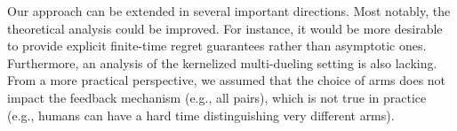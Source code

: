 Our approach can be extended in several important directions.  Most notably, the theoretical analysis could be improved.  For instance, it would be more desirable to provide explicit finite-time regret guarantees rather than asymptotic ones.  Furthermore, an analysis of the kernelized multi-dueling setting is also lacking.  From a more practical perspective, we assumed that the choice of arms does not impact the feedback mechanism (e.g., all pairs), which is not true in practice (e.g., humans can have a hard time distinguishing very different arms).
